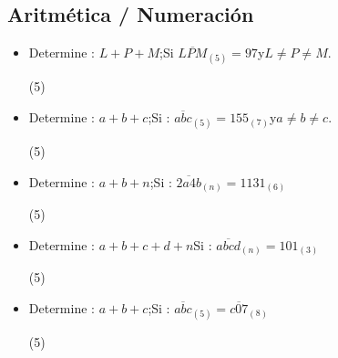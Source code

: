 \documentclass[10pt, twocolumn, landscape, a4paper]{article}
\begin{document}
\subsection*{Aritmética / Numeración}

\begin{itemize}
\item{Determine : $L + P + M$;\quad Si $\overline{LPM}_{(5)} = 97$\quad y\quad $L \neq P \neq M$.
\begin{tasks}(5)
\end{tasks}
}
\item{Determine : $a + b + c$;\quad Si : $\overline{abc}_{(5)} = 155_{(7)}$\quad y\quad $a \neq b \neq c$.
\begin{tasks}(5)
\end{tasks}
}
\item{Determine : $a + b + n$;\quad Si : $\overline{2a4b}_{(n)} = 1131_{(6)}$
\begin{tasks}(5)
\end{tasks}
}
\item{Determine : $a + b + c + d + n$\quad Si : $\overline{abcd}_{(n)} = 101_{(3)}$
\begin{tasks}(5)
\end{tasks}
}
\item{Determine : $a + b + c$;\quad Si : $\overline{abc}_{(5)} = \overline{c07}_{(8)}$
\begin{tasks}(5)
\end{tasks}
}
\end{itemize}
\end{document}
